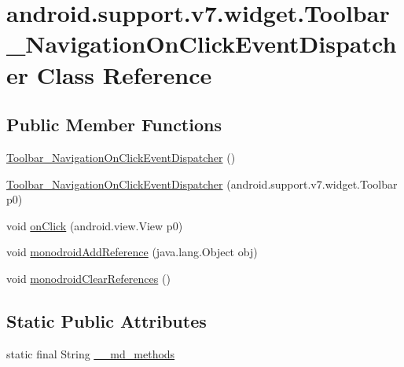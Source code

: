 \hypertarget{classandroid_1_1support_1_1v7_1_1widget_1_1_toolbar___navigation_on_click_event_dispatcher}{
\section{android.support.v7.widget.Toolbar\_\-NavigationOnClickEventDispatcher Class Reference}
\label{classandroid_1_1support_1_1v7_1_1widget_1_1_toolbar___navigation_on_click_event_dispatcher}
}
\subsection*{Public Member Functions}
\begin{CompactItemize}
\item 
\hyperlink{classandroid_1_1support_1_1v7_1_1widget_1_1_toolbar___navigation_on_click_event_dispatcher_d096b2c7e8ad983ed031f9f22712fbdf}{Toolbar\_\-NavigationOnClickEventDispatcher} ()
\item 
\hyperlink{classandroid_1_1support_1_1v7_1_1widget_1_1_toolbar___navigation_on_click_event_dispatcher_0c1d66856f34b4dcbc6387abdebd3c72}{Toolbar\_\-NavigationOnClickEventDispatcher} (android.support.v7.widget.Toolbar p0)
\item 
void \hyperlink{classandroid_1_1support_1_1v7_1_1widget_1_1_toolbar___navigation_on_click_event_dispatcher_59518f53b2c1df0102f4833a6260d5dc}{onClick} (android.view.View p0)
\item 
void \hyperlink{classandroid_1_1support_1_1v7_1_1widget_1_1_toolbar___navigation_on_click_event_dispatcher_f7f274e66fb83d380643feda03368bbb}{monodroidAddReference} (java.lang.Object obj)
\item 
void \hyperlink{classandroid_1_1support_1_1v7_1_1widget_1_1_toolbar___navigation_on_click_event_dispatcher_e35f48770412dbae3caf5ebef20a26f9}{monodroidClearReferences} ()
\end{CompactItemize}
\subsection*{Static Public Attributes}
\begin{CompactItemize}
\item 
static final String \hyperlink{classandroid_1_1support_1_1v7_1_1widget_1_1_toolbar___navigation_on_click_event_dispatcher_97c82ce49b45088298de714d868899df}{\_\-\_\-md\_\-methods}
\end{CompactItemize}
